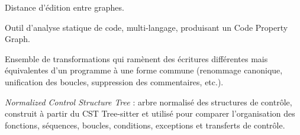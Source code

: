 \documentclass[12pt,a4paper,oneside]{report}
\begin{document}
\begin{description}[style=nextline,leftmargin=1cm,itemsep=0.25em]
\item[GED (\emph{Graph Edit Distance})] Distance d'édition entre graphes.
\item[Joern] Outil d'analyse statique de code, multi-langage, produisant un Code Property Graph.
\item[Normalisation de code] Ensemble de transformations qui ramènent des écritures différentes mais équivalentes d'un programme à une forme commune (renommage canonique, unification des boucles, suppression des commentaires, etc.).
\item[NCST] \emph{Normalized Control Structure Tree} : arbre normalisé
des structures de contrôle, construit à partir du CST Tree-sitter et utilisé
pour comparer l'organisation des fonctions, séquences, boucles, conditions,
exceptions et transferts de contrôle.




\end{description}
\end{document}
